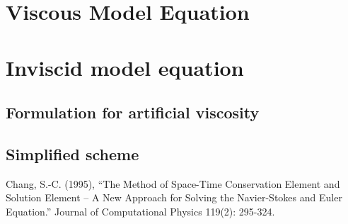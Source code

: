 \documentclass[a4paper,12pt,dvips]{article}
\begin{document}
\section{Viscous Model Equation}

\section{Inviscid model equation}

\subsection{Formulation for artificial viscosity}

\subsection{Simplified scheme}

\begin{thebibliography}{99}
 Chang, S.-C. (1995), 
``The Method of Space-Time Conservation Element and Solution Element -- 
A New Approach for Solving the Navier-Stokes and Euler Equation.''
Journal of Computational Physics 119(2): 295-324.
\end{thebibliography}
\end{document}

